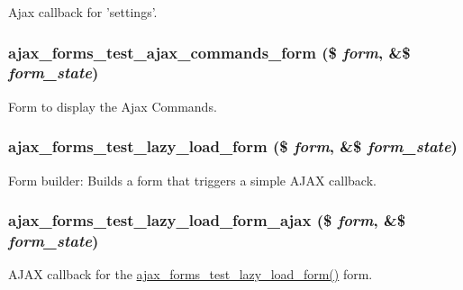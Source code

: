 \label{ajax__forms__test_8module_a40b5124962d966ad45e590274035f01b}
Ajax callback for 'settings'. \hypertarget{ajax__forms__test_8module_ac99f404a0844e3198eb97beddc193ee9}{
\subsubsection[{ajax\_\-forms\_\-test\_\-ajax\_\-commands\_\-form}]{\setlength{\rightskip}{0pt plus 5cm}ajax\_\-forms\_\-test\_\-ajax\_\-commands\_\-form (\$ {\em form}, \/  \&\$ {\em form\_\-state})}}
\label{ajax__forms__test_8module_ac99f404a0844e3198eb97beddc193ee9}
Form to display the Ajax Commands. \hypertarget{ajax__forms__test_8module_a15e98e8d679461185f6a9f6983a3322d}{
\subsubsection[{ajax\_\-forms\_\-test\_\-lazy\_\-load\_\-form}]{\setlength{\rightskip}{0pt plus 5cm}ajax\_\-forms\_\-test\_\-lazy\_\-load\_\-form (\$ {\em form}, \/  \&\$ {\em form\_\-state})}}
\label{ajax__forms__test_8module_a15e98e8d679461185f6a9f6983a3322d}
Form builder: Builds a form that triggers a simple AJAX callback. \hypertarget{ajax__forms__test_8module_a7ecee9a8051e98114f55ff1449126cb6}{
\subsubsection[{ajax\_\-forms\_\-test\_\-lazy\_\-load\_\-form\_\-ajax}]{\setlength{\rightskip}{0pt plus 5cm}ajax\_\-forms\_\-test\_\-lazy\_\-load\_\-form\_\-ajax (\$ {\em form}, \/  \&\$ {\em form\_\-state})}}
\label{ajax__forms__test_8module_a7ecee9a8051e98114f55ff1449126cb6}
AJAX callback for the \hyperlink{ajax__forms__test_8module_a15e98e8d679461185f6a9f6983a3322d}{ajax\_\-forms\_\-test\_\-lazy\_\-load\_\-form()} form.

